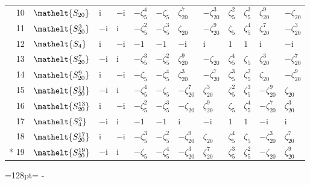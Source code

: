 \documentclass[10pt,a4paper]{article}
\newcommand{\needspace}[1]{\par\penalty-100\begingroup\dimen0=#1\relax\dimen2=\pagegoal
  \advance\dimen2-\pagetotal\ifdim\dimen0>\dimen2\relax\ifdim\dimen2>0pt\vfil\break\fi\fi
  \endgroup}
\numberwithin{equation}{section}
\newcommand{\eltfont}[1]{{\let\sigma\eltsigma\mathelt{#1}}}
\newcommand{\cls}[1]{\eltfont{#1}}
\newcommand{\iunit}{\mathrm{i}}
\newcommand{\rootunity}[1]{\zeta_{#1}}
\begin{document}
{\begin{longtable}{@{}rlllllllllll@{}}
10 & $\cls{S_{20}}$ & $\iunit{}$ & $-\iunit{}$ & $-\rootunity{5}^{4}$ & $-\rootunity{5}$ & $\rootunity{20}^{7}$ & $-\rootunity{20}^{3}$ & $\rootunity{5}^{2}$ & $\rootunity{5}^{3}$ & $\rootunity{20}^{9}$ & $-\rootunity{20}$\\
11 & $\cls{S_{20}^{3}}$ & $-\iunit{}$ & $\iunit{}$ & $-\rootunity{5}^{2}$ & $-\rootunity{5}^{3}$ & $\rootunity{20}$ & $-\rootunity{20}^{9}$ & $\rootunity{5}$ & $\rootunity{5}^{4}$ & $\rootunity{20}^{7}$ & $-\rootunity{20}^{3}$\\
12 & $\cls{S_{4}}$ & $\iunit{}$ & $-\iunit{}$ & $-1$ & $-1$ & $-\iunit{}$ & $\iunit{}$ & $1$ & $1$ & $\iunit{}$ & $-\iunit{}$\\
13 & $\cls{S_{20}^{7}}$ & $-\iunit{}$ & $\iunit{}$ & $-\rootunity{5}^{3}$ & $-\rootunity{5}^{2}$ & $\rootunity{20}^{9}$ & $-\rootunity{20}$ & $\rootunity{5}^{4}$ & $\rootunity{5}$ & $\rootunity{20}^{3}$ & $-\rootunity{20}^{7}$\\
14 & $\cls{S_{20}^{9}}$ & $\iunit{}$ & $-\iunit{}$ & $-\rootunity{5}$ & $-\rootunity{5}^{4}$ & $\rootunity{20}^{3}$ & $-\rootunity{20}^{7}$ & $\rootunity{5}^{3}$ & $\rootunity{5}^{2}$ & $\rootunity{20}$ & $-\rootunity{20}^{9}$\\
15 & $\cls{S_{20}^{11}}$ & $-\iunit{}$ & $\iunit{}$ & $-\rootunity{5}^{4}$ & $-\rootunity{5}$ & $-\rootunity{20}^{7}$ & $\rootunity{20}^{3}$ & $\rootunity{5}^{2}$ & $\rootunity{5}^{3}$ & $-\rootunity{20}^{9}$ & $\rootunity{20}$\\
16 & $\cls{S_{20}^{13}}$ & $\iunit{}$ & $-\iunit{}$ & $-\rootunity{5}^{2}$ & $-\rootunity{5}^{3}$ & $-\rootunity{20}$ & $\rootunity{20}^{9}$ & $\rootunity{5}$ & $\rootunity{5}^{4}$ & $-\rootunity{20}^{7}$ & $\rootunity{20}^{3}$\\
17 & $\cls{S_{4}^{3}}$ & $-\iunit{}$ & $\iunit{}$ & $-1$ & $-1$ & $\iunit{}$ & $-\iunit{}$ & $1$ & $1$ & $-\iunit{}$ & $\iunit{}$\\
18 & $\cls{S_{20}^{17}}$ & $\iunit{}$ & $-\iunit{}$ & $-\rootunity{5}^{3}$ & $-\rootunity{5}^{2}$ & $-\rootunity{20}^{9}$ & $\rootunity{20}$ & $\rootunity{5}^{4}$ & $\rootunity{5}$ & $-\rootunity{20}^{3}$ & $\rootunity{20}^{7}$\\*
19 & $\cls{S_{20}^{19}}$ & $-\iunit{}$ & $\iunit{}$ & $-\rootunity{5}$ & $-\rootunity{5}^{4}$ & $-\rootunity{20}^{3}$ & $\rootunity{20}^{7}$ & $\rootunity{5}^{3}$ & $\rootunity{5}^{2}$ & $-\rootunity{20}$ & $\rootunity{20}^{9}$\\
\bottomrule\end{longtable}}
\needspace{128pt}
\end{document}
